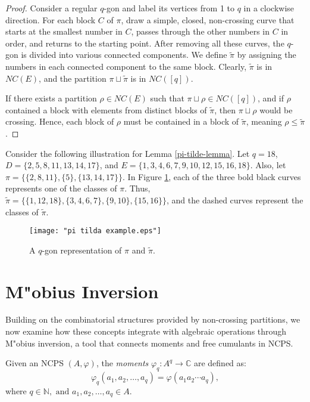 \begin{proof}
Consider a regular $q$-gon and label its vertices from 1 to $q$ in a clockwise direction. For each block $C$ of $\pi$, draw a simple, closed, non-crossing curve that starts at the smallest number in $C$, passes through the other numbers in $C$ in order, and returns to the starting point. After removing all these curves, the $q$-gon is divided into various connected components. We define $\tilde{\pi}$ by assigning the numbers in each connected component to the same block. Clearly, $\tilde{\pi}$ is in $NC(E)$, and the partition $\pi \sqcup \tilde{\pi}$ is in $NC([q])$.

If there exists a partition $\rho \in NC(E)$ such that $\pi \sqcup \rho \in NC([q])$, and if $\rho$ contained a block with elements from distinct blocks of $\tilde{\pi}$, then $\pi \sqcup \rho$ would be crossing. Hence, each block of $\rho$ must be contained in a block of $\tilde{\pi}$, meaning $\rho \leq \tilde{\pi}$.
\end{proof}

Consider the following illustration for Lemma \ref{pi-tilde-lemma}. Let $q = 18$, $D = \{2, 5, 8, 11, 13, 14, 17\}$, and $E = \{1, 3, 4, 6, 7, 9, 10, 12, 15, 16, 18\}$. Also, let $\pi = \{\{2, 8, 11\}, \{5\}, \{13, 14, 17\}\}$. In Figure \ref{fig:pi tilda example}, each of the three bold black curves represents one of the classes of $\pi$. Thus, $\tilde{\pi} = \{\{1, 12, 18\}, \{3, 4, 6, 7\}, \{9, 10\}, \{15, 16\}\}$, and the dashed curves represent the classes of $\tilde{\pi}$.

\begin{figure}[h!]
    \centering
    \texttt{[image: "pi tilda example.eps"]}
    \caption{A $q$-gon representation of $\pi$ and $\tilde{\pi}$.}
    \label{fig:pi tilda example}
\end{figure}


\section{M"{o}bius Inversion}\label{sec:Mobius-inversion}

Building on the combinatorial structures provided by non-crossing partitions, we now examine how these concepts integrate with algebraic operations through M"{o}bius inversion, a tool that connects moments and free cumulants in NCPS.

\begin{definition}
Given an NCPS $(A, \varphi)$, the \textit{moments} $\varphi_q: A^q \rightarrow {\mathbb C}$ are defined as:
\[
\varphi_q(a_1, a_2, \ldots, a_q) = \varphi(a_1 a_2 \cdots a_q),
\]
where $q\in \mathbb{N},\text{ and } a_1, a_2, \dots, a_q \in A$.
\end{definition}

